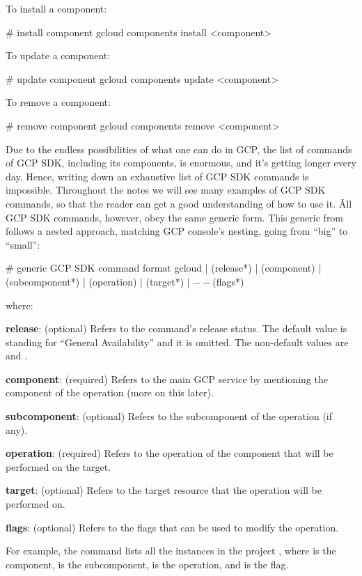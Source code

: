 To install a component:
\begin{bash}
# install component
gcloud components install <component>
\end{bash}

To update a component:
\begin{bash}
# update component
gcloud components update <component>
\end{bash}

To remove a component:
\begin{bash}
# remove component
gcloud components remove <component>
\end{bash}

Due to the endless possibilities of what one can do in GCP, the list of commands of GCP SDK, including its components,
is enormous, and it's getting longer every day. Hence, writing down an exhaustive list of GCP SDK commands is impossible.
Throughout the notes we will see many examples of GCP SDK commands, so that the reader can get a good understanding of
how to use it. \v

All GCP SDK commands, however, obey the same generic form. This generic from follows a nested approach, matching GCP
console's nesting, going from ``big'' to ``small'':
\begin{bash}
# generic GCP SDK command format
gcloud | (release*) | (component) | (subcomponent*) | (operation) | (target*) | $--$(flags*)
\end{bash}

where:
\bit
\item \textbf{release}: (optional) Refers to the command's release status. The default value is  standing for
``General Availability'' and it is omitted. The non-default values are  and .
\item \textbf{component}: (required) Refers to the main GCP service by mentioning the component of the operation (more
on this later).
\item \textbf{subcomponent}: (optional) Refers to the subcomponent of the operation (if any).
\item \textbf{operation}: (required) Refers to the operation of the component that will be performed on the target.
\item \textbf{target}: (optional) Refers to the target resource that the operation will be performed on.
\item \textbf{flags}: (optional) Refers to the flags that can be used to modify the operation.
\eit

\be
For example, the command  lists all the instances in the
project , where  is the component,  is the subcomponent, 
is the operation, and  is the flag.
\ee

